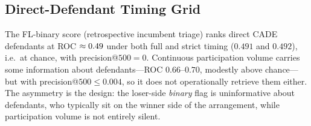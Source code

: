 \subsection{Direct-Defendant Timing Grid}
\label{supp:direct_defendant_timing}

The FL-binary score (retrospective incumbent triage) ranks direct CADE
defendants at ROC $\approx 0.49$ under both full and
strict timing ($0.491$ and $0.492$), i.e.\ at chance, with
precision@$500=0$. Continuous participation volume carries some
information about defendants---ROC $0.66$--$0.70$, modestly above
chance---but with precision@$500\le0.004$, so it does not operationally
retrieve them either. The asymmetry is the design: the loser-side
\emph{binary} flag is uninformative about defendants, who typically sit
on the winner side of the arrangement, while participation volume is not
entirely silent.
